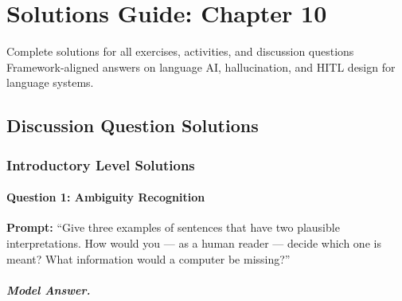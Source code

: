 
\chapter{Solutions Guide: Chapter 10}
\label{ch:solutions-ch10}

\begin{chapterquote}{Complete solutions for all exercises, activities, and discussion questions}
Framework-aligned answers on language AI, hallucination, and HITL design for language systems.
\end{chapterquote}

\section{Discussion Question Solutions}

\subsection{Introductory Level Solutions}

\subsubsection{Question 1: Ambiguity Recognition}

\textbf{Prompt:} ``Give three examples of sentences that have two plausible interpretations. How would you --- as a human reader --- decide which one is meant? What information would a computer be missing?''

\paragraph{Model Answer.}

